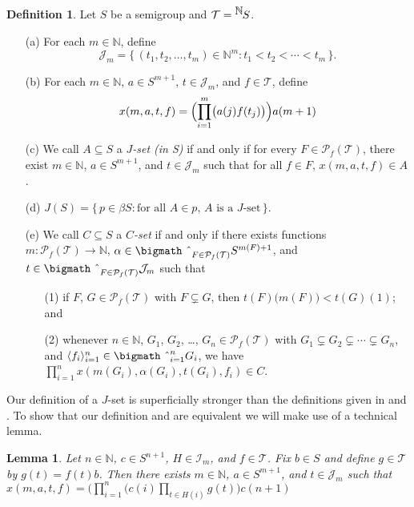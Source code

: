 \documentclass[12pt]{article}
\theoremstyle{plain}
\newtheorem{lem}[thm]{Lemma}
\theoremstyle{definition}
\newtheorem{defn}[thm]{Definition}
\newcommand{\la}{\langle}
\newcommand{\ra}{\rangle}
\newcommand{\bbN}{\mathbb{N}}
\newcommand{\calI}{\mathcal{I}}
\newcommand{\calJ}{\mathcal{J}}
\newcommand{\calT}{\mathcal{T}}
\newcommand{\Pf}{\mathcal{P}_f}
\newcommand{\setfunc}[2]{\hbox{${}^{\hbox{$#1$}}\hskip -1 pt #2$}}
\newcommand{\bigtimes}{\hbox{\bigmath \char'2}}
\begin{document}
\begin{defn}
  Let $S$ be a semigroup and $\calT = \setfunc{\bbN}{S}$.
  \begin{itemize}
    \item[(a)] For each $m \in \bbN$, define
      \[
        \calJ_m = \{\, (t_1, t_2, \ldots, t_m) \in \bbN^m : t_1 < t_2
        < \cdots < t_m \,\}.
      \]

    \item[(b)] For each $m \in \bbN$, $a \in S^{m+1}$, $t \in
      \calJ_m$, and $f \in \calT$, define
      \[
        x(m, a, t, f) = \Bigl(\prod_{i=1}^m\bigl( a(j) f(t_j) \bigr)\Bigr) a(m+1)
      \]

    \item[(c)] We call $A \subseteq S$ a \textsl{$J$-set (in S)} if
      and only if for every $F \in \Pf(\calT)$, there exist $m \in
      \bbN$, $a \in S^{m+1}$, and $t \in \calJ_m$ such that for all $f
      \in F$, $x(m, a, t, f) \in A$.

    \item[(d)] $J(S) = \{\, p \in \beta S : \mbox{for all $A \in p$,
        $A$ is a $J$-set} \,\}$.

    \item[(e)] We call $C \subseteq S$ a \textsl{$C$-set} if and only
      if there exists functions $m \colon \Pf(\calT) \to \bbN$,
      $\alpha \in \bigtimes_{F \in \Pf(\calT)} S^{m(F) + 1}$, and $t
      \in \bigtimes_{F \in \Pf(\calT)} \calJ_m$ such that
      \begin{itemize}
        \item[(1)] if $F$, $G \in \Pf(\calT)$ with $F \subsetneq G$,
          then $t(F)\bigl( m(F) \bigr) < t(G)(1)$; and
        
        \item[(2)] whenever $n \in \bbN$, $G_1$, $G_2$, \ldots, $G_n
          \in \Pf(\calT)$ with $G_1 \subsetneq G_2 \subsetneq \cdots
          \subsetneq G_n$, and $\la f_i \ra_{i=1}^n \in
          \bigtimes_{i=1}^n G_i$, we have
          $\prod_{i=1}^n x(m(G_i), \alpha(G_i), t(G_i), f_i) \in C$. 
      \end{itemize}
  \end{itemize}
\end{defn}
Our definition of a $J$-set is superficially stronger than the
definitions given in \cite[Definition 2.3(d)]{Hindman:2010fk} and
\cite[Definition 3.3(e)]{De:2008uq}. 
To show that our definition and \cite[Definition
2.3(d)]{Hindman:2010fk} are equivalent we will make use of a technical
lemma.
\begin{lem}
  Let $n \in \bbN$, $c \in S^{n+1}$, $H \in \calI_m$, and $f \in
  \calT$. 
  Fix $b \in S$ and define $g \in \calT$ by $g(t) = f(t)b$. 
  Then there exists $m \in \bbN$, $a \in S^{m+1}$, and $t \in \calJ_m$
  such that $x(m, a, t, f) = \bigl(\prod_{i=1}^n( c(i) \prod_{t \in H(i)}
  g(t)\bigr) c(n+1)$
\end{lem}
\end{document}
